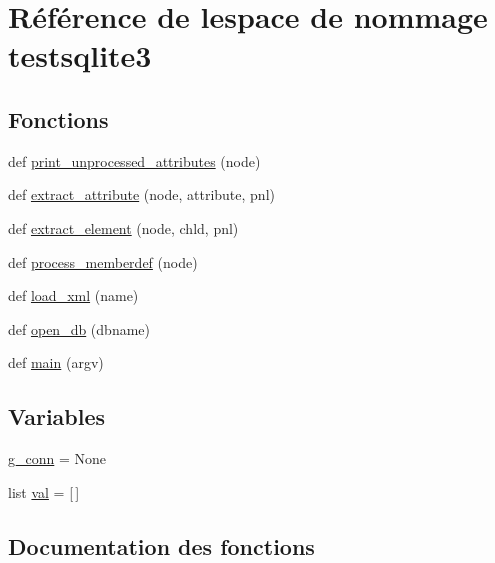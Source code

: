 \hypertarget{namespacetestsqlite3}{}\section{Référence de l\textquotesingle{}espace de nommage testsqlite3}
\label{namespacetestsqlite3}
\subsection*{Fonctions}
\begin{DoxyCompactItemize}
\item 
def \hyperlink{namespacetestsqlite3_ac04c25addd3395895ac07486c16eb5b2}{print\+\_\+unprocessed\+\_\+attributes} (node)
\item 
def \hyperlink{namespacetestsqlite3_ae42f8208935118b6ff40ef2ac0491746}{extract\+\_\+attribute} (node, attribute, pnl)
\item 
def \hyperlink{namespacetestsqlite3_aafce25e9b795e28ff7e88b9990eb3a05}{extract\+\_\+element} (node, chld, pnl)
\item 
def \hyperlink{namespacetestsqlite3_a8e1458ce86a98b0d2f73291d8d491ca4}{process\+\_\+memberdef} (node)
\item 
def \hyperlink{namespacetestsqlite3_abd5f834299ea3f156a0bf7c7ba28b2f1}{load\+\_\+xml} (name)
\item 
def \hyperlink{namespacetestsqlite3_a9974344e3a4198d5f3374d15253cc024}{open\+\_\+db} (dbname)
\item 
def \hyperlink{namespacetestsqlite3_aefefa91a834135066286c13d1e20040e}{main} (argv)
\end{DoxyCompactItemize}
\subsection*{Variables}
\begin{DoxyCompactItemize}
\item 
\hyperlink{namespacetestsqlite3_a8e888724f88a8a5e14814854881d3b62}{g\+\_\+conn} = None
\item 
list \hyperlink{namespacetestsqlite3_a89f257aa0cc19fe4500d418f6fbfedfe}{val} = \mbox{[}$\,$\mbox{]}
\end{DoxyCompactItemize}


\subsection{Documentation des fonctions}
\hypertarget{namespacetestsqlite3_ae42f8208935118b6ff40ef2ac0491746}{}
